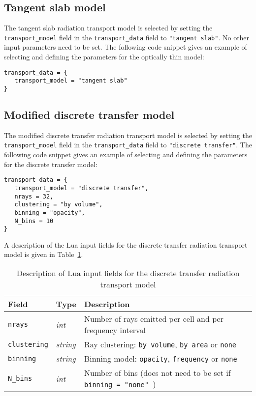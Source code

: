 \subsection{Tangent slab model}

The tangent slab radiation transport model is selected by setting the \texttt{transport\_model} field in the \texttt{transport\_data} field to \texttt{"tangent slab"}.
No other input parameters need to be set.
The following code snippet gives an example of selecting and defining the parameters for the optically thin model:

\noindent \topbar
\begin{lstlisting}[basicstyle=\ttfamily\normalsize]
transport_data = {
   transport_model = "tangent slab"
}
\end{lstlisting}
\bottombar

\subsection{Modified discrete transfer model}

The modified discrete transfer radiation transport model is selected by setting the \texttt{transport\_model} field in the \texttt{transport\_data} field to \texttt{"discrete transfer"}.
The following code snippet gives an example of selecting and defining the parameters for the discrete transfer model:

\noindent \topbar
\begin{lstlisting}[basicstyle=\ttfamily\normalsize]
transport_data = {
   transport_model = "discrete transfer",
   nrays = 32,
   clustering = "by volume",
   binning = "opacity",
   N_bins = 10
}
\end{lstlisting}
\bottombar

A description of the Lua input fields for the discrete transfer radiation transport model is given in Table~\ref {tab:DTM-input}.

\begin{table}[h]
 \begin{center}
  \caption{Description of Lua input fields for the discrete transfer radiation transport model}
  \label{tab:DTM-input}
\begin{tabular}{llp{8cm}}
 \hline \hline
 Field                        & Type              &  Description \\ \hline
\texttt{nrays}            & \textit{int}       &  Number of rays emitted per cell and per frequency interval \\
\texttt{clustering}    & \textit{string}  &  Ray clustering: \texttt{by volume}, \texttt{by area} or \texttt{none} \\
\texttt{binning}        & \textit{string}  &  Binning model: \texttt{opacity}, \texttt{frequency} or \texttt{none} \\
\texttt{N\_bins}         & \textit{int}       &  Number of bins (does not need to be set if \texttt{ binning = "none" }) \\
\hline
\end{tabular}
\end{center}
\end{table}

